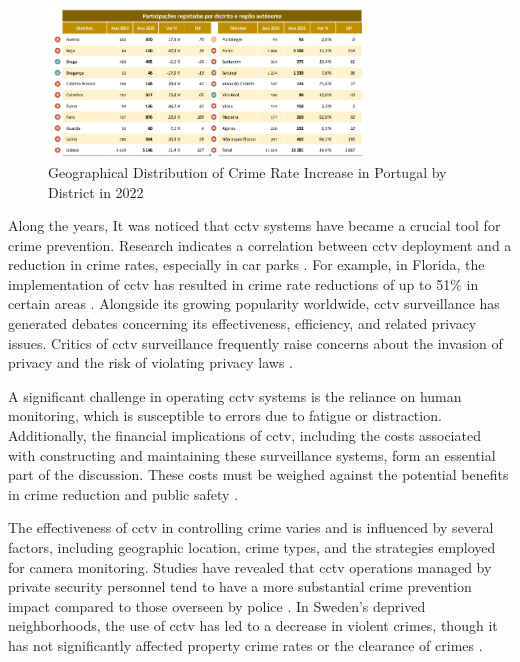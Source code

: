 \begin{figure}[h]
    \centering 
    \includegraphics[width=0.75\textwidth]{figs/geo-crimes-rate.png} 
    \caption{Geographical Distribution of Crime Rate Increase in Portugal by District in 2022 \cite{rfc41}}
    \label{fig:geo-crimes}
\end{figure}

Along the years, It was noticed that \ac{cctv} systems have became a 
crucial tool for crime prevention. Research indicates a 
correlation between \ac{cctv} deployment and a reduction in crime rates, especially in car parks 
\cite{rfc33}. For example, in Florida, the implementation of \ac{cctv} has resulted in 
crime rate reductions of up to 51\% in certain areas \cite{rfc34}. Alongside its growing 
popularity worldwide, \ac{cctv} surveillance has generated debates concerning its effectiveness, efficiency, and 
related privacy issues. Critics of \ac{cctv} surveillance frequently raise concerns about the invasion of privacy 
and the risk of violating privacy laws \cite{rfc38}.

A significant challenge in operating \ac{cctv} systems is the reliance on human monitoring, which is susceptible to errors due to fatigue or distraction. Additionally, the financial implications of \ac{cctv}, including the costs associated with constructing and maintaining these surveillance systems, form an essential part of the discussion. These costs must be weighed against the potential benefits in crime reduction and public safety \cite{rfc38}. 

The effectiveness of \ac{cctv} in controlling crime varies and is influenced by several factors, including geographic location, crime types, and the strategies employed for camera monitoring. Studies have revealed that \ac{cctv} operations managed by private security personnel tend to have a more substantial crime prevention impact compared to those overseen by police \cite{rfc36}. In Sweden's deprived neighborhoods, the use of \ac{cctv} has led to a decrease in violent crimes, though it has not significantly affected property crime rates or the clearance of crimes \cite{rfc35}.

